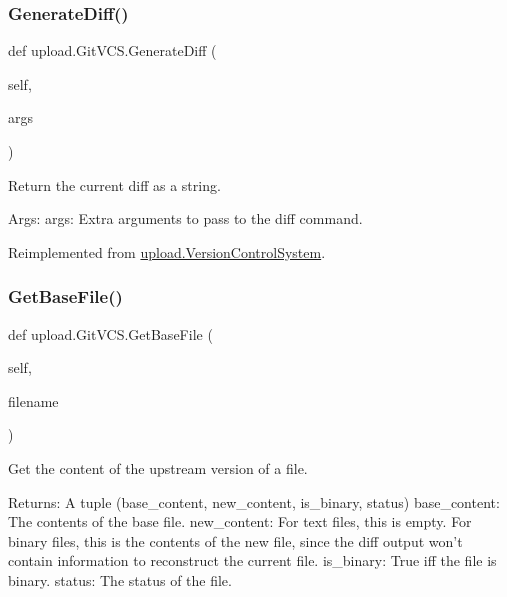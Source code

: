 \mbox{\label{classupload_1_1_git_v_c_s_a3ebfc01cebc9b585706ad3f4389a8833}} 
\subsubsection{\texorpdfstring{GenerateDiff()}{GenerateDiff()}\hspace{0.1cm}{\footnotesize\ttfamily [2/2]}}
{\footnotesize\ttfamily def upload.\+Git\+V\+C\+S.\+Generate\+Diff (\begin{DoxyParamCaption}\item[{}]{self,  }\item[{}]{args }\end{DoxyParamCaption})}

\begin{DoxyVerb}Return the current diff as a string.

Args:
  args: Extra arguments to pass to the diff command.
\end{DoxyVerb}
 

Reimplemented from \mbox{\hyperlink{classupload_1_1_version_control_system_aa5eb260c96e7016dab36b5fc136c9f49}{upload.\+Version\+Control\+System}}.

\mbox{\label{classupload_1_1_git_v_c_s_a70ddb65a6b512b8cb8cc4affa37ff9b4}} 
\subsubsection{\texorpdfstring{GetBaseFile()}{GetBaseFile()}\hspace{0.1cm}{\footnotesize\ttfamily [1/2]}}
{\footnotesize\ttfamily def upload.\+Git\+V\+C\+S.\+Get\+Base\+File (\begin{DoxyParamCaption}\item[{}]{self,  }\item[{}]{filename }\end{DoxyParamCaption})}

\begin{DoxyVerb}Get the content of the upstream version of a file.

Returns:
  A tuple (base_content, new_content, is_binary, status)
base_content: The contents of the base file.
new_content: For text files, this is empty.  For binary files, this is
  the contents of the new file, since the diff output won't contain
  information to reconstruct the current file.
is_binary: True iff the file is binary.
status: The status of the file.
\end{DoxyVerb}
 

